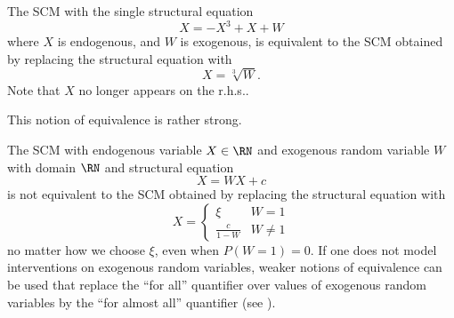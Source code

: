 \begin{Eg}\label{eg:equivalent_scm}
  The SCM with the single structural equation
  $$X = -X^3 + X + W$$
  where $X$ is endogenous, and $W$ is exogenous, is equivalent to the SCM obtained by replacing the structural equation with
  $$X = \sqrt[3]{W}.$$
  Note that $X$ no longer appears on the r.h.s..
\end{Eg}
This notion of equivalence is rather strong. 
\begin{Eg}\label{eg:self_cycle}
  The SCM with endogenous variable $X \in \RN$ and exogenous random variable $W$ with domain $\RN$ and structural equation
  $$X = W X + c$$
  is not equivalent to the SCM obtained by replacing the structural equation with
  $$X = \begin{cases}
          \xi & W = 1 \\
          \frac{c}{1 - W} & W \ne 1
        \end{cases}$$
  no matter how we choose $\xi$, even when $P(W=1) = 0$. 
  If one does not model interventions on exogenous random variables, weaker notions of equivalence 
  can be used that replace the ``for all'' quantifier over values of exogenous random variables by the
  ``for almost all'' quantifier (see \cite{BFPM21}).
\end{Eg}

